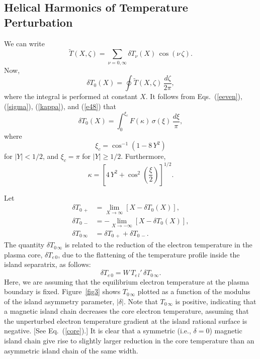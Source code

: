 \documentclass[12pt,prb,aps]{revtex4-1}
\begin{document}
\subsection{Helical Harmonics of Temperature Perturbation}
We can write
\begin{equation}
\tilde{T}(X,\zeta)=\sum_{\nu=0,\infty}\delta T_\nu(X)\,\cos(\nu\,\zeta).
\end{equation}
Now,
\begin{equation}
\delta T_0(X) = \oint \tilde{T}(X,\zeta)\,\frac{d\zeta}{2\pi},
\end{equation}
where the integral is performed at constant $X$. It follows from Eqs.~(\ref{eeven}), (\ref{sigma}),  (\ref{kappa}), and (\ref{e48}) that
\begin{equation}
\delta T_0(X) = \int_0^{\xi_c}F(\kappa)\,\sigma(\xi)\,\frac{d\xi}{\pi},
\end{equation}
where 
\begin{equation}
\xi_c = \cos^{-1}(1-8\,Y^2)
\end{equation}
for $|Y|<1/2$, and $\xi_c=\pi$ for $|Y|\geq 1/2$. Furthermore,
\begin{equation}
\kappa =\left[4\,Y^2 +\cos^2\left(\frac{\xi}{2}\right)\right]^{1/2}.
\end{equation}

Let 
\begin{align}
\delta T_{0\,+} &=\lim_{X\rightarrow \infty}\left[X - \delta T_0(X)\right],\\[0.5ex]
\delta T_{0\,-} &=-\lim_{X\rightarrow -\infty}\left[X - \delta T_0(X)\right],\\[0.5ex]
\delta T_{0\,\infty} &= \delta T_{0\,+}+ \delta T_{0\,-}.
\end{align}
The quantity $\delta T_{0\,\infty}$ is related to the reduction of the electron temperature in the plasma core, $\delta T_{e\,0}$, due to the flattening of the
temperature profile inside the island separatrix, as follows:
\begin{equation}\label{core}
\delta T_{e\,0} = W\,T_{e\,l}'\,\delta T_{0\,\infty}.
\end{equation}
Here, we are assuming that the equilibrium electron temperature at the plasma boundary is fixed.\cite{chang}
Figure~\ref{fig3} shows $T_{0\,\infty}$ plotted as a function of the modulus of the island asymmetry parameter, $|\delta|$.  
Note that $T_{0\,\infty}$ is positive, indicating that a magnetic island chain decreases the core electron temperature, assuming that the
unperturbed electron temperature gradient at the island rational surface is negative. [See Eq.~(\ref{core}).] It is clear that a symmetric (i.e., $\delta=0$) magnetic
island chain give rise to slightly larger reduction in the core temperature than an asymmetric island chain of the same width. 
\end{document}
